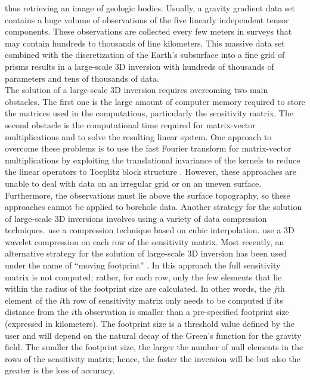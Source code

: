 thus retrieving an image of geologic bodies.
Usually, a gravity gradient data set contains a huge volume of observations of
the five linearly independent tensor components.
These observations are collected every few meters in surveys that may contain
hundreds to thousands of line kilometers.
This massive data set combined with the discretization of the Earth's subsurface
into a fine grid of prisms results in a large-scale 3D inversion with hundreds
of thousands of parameters and tens of thousands of data.
\\ \indent 
The solution of a large-scale 3D inversion requires overcoming two main
obstacles.
The first one is the large amount of computer memory required to
store the matrices used in the computations, particularly the sensitivity
matrix.
The second obstacle is the computational time
required for matrix-vector multiplications
and to solve the resulting linear system.
One approach to overcome these problems is to use the fast Fourier transform for
matrix-vector multiplications by exploiting the translational invariance of the
kernels to reduce the linear operators to Toeplitz block structure
\citep{pilkington, zhdanov04, wilson}.
However, these approaches are unable to deal with data on an irregular grid or
on an uneven surface.
Furthermore, the observations must lie above the surface topography, so these
approaches cannot be applied to borehole data.
Another strategy for the solution of large-scale 3D inversions involves using a
variety of data compression techniques.
\citet{portniaguine02} use a compression technique based on cubic interpolation.
\citet{li_oldenburg03} use a 3D wavelet compression on each row of the
sensitivity matrix.
Most recently, an alternative strategy for the solution of large-scale 3D
inversion has been used under the name of ``moving footprint''
\citep{cox, zhdanov10a, wilson}.
In this approach the full sensitivity matrix is not computed; rather, for each
row, only the few elements that lie within the radius of the footprint size are
calculated.
In other words, the $j$th element of the $i$th row of sensitivity matrix only
needs to be computed if its distance from the $i$th observation is smaller than
a pre-specified footprint size (expressed in kilometers).
The footprint size is a threshold value defined by the user and will depend on
the natural decay of the Green's function for the gravity field.
The smaller the footprint size, the larger the number of null elements in the
rows of the sensitivity matrix; hence, the faster the inversion will be
but also the greater is the loss of accuracy.
